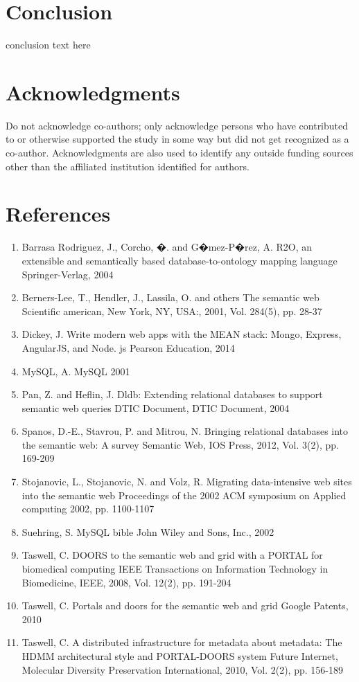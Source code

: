 \documentclass[10pt,twocolumn,twoside]{article}
\begin{document}
\section*{Conclusion}
\label{secConclusion}
conclusion text here


\section*{Acknowledgments}
Do not acknowledge co-authors; only acknowledge persons who have contributed
to or otherwise supported the study in some way but did not get recognized as a co-author.
Acknowledgments are also used to identify any outside funding sources other than
the affiliated institution identified for authors.


\section*{References}
\begin{enumerate}
\item Barrasa Rodriguez, J., Corcho, �. and G�mez-P�rez, A.
R2O, an extensible and semantically based database-to-ontology mapping language
Springer-Verlag, 2004
\item Berners-Lee, T., Hendler, J., Lassila, O. and others
The semantic web
Scientific american, New York, NY, USA:, 2001, Vol. 284(5), pp. 28-37
\item Dickey, J.
Write modern web apps with the MEAN stack: Mongo, Express, AngularJS, and Node. js
Pearson Education, 2014
\item MySQL, A.
MySQL
2001
\item Pan, Z. and Heflin, J.
Dldb: Extending relational databases to support semantic web queries
DTIC Document, DTIC Document, 2004
\item Spanos, D.-E., Stavrou, P. and Mitrou, N.
Bringing relational databases into the semantic web: A survey
Semantic Web, IOS Press, 2012, Vol. 3(2), pp. 169-209
\item Stojanovic, L., Stojanovic, N. and Volz, R.
Migrating data-intensive web sites into the semantic web
Proceedings of the 2002 ACM symposium on Applied computing
2002, pp. 1100-1107
\item Suehring, S.
MySQL bible
John Wiley and Sons, Inc., 2002
\item Taswell, C.
DOORS to the semantic web and grid with a PORTAL for biomedical computing
IEEE Transactions on Information Technology in Biomedicine, IEEE, 2008, Vol. 12(2), pp. 191-204
\item Taswell, C.
Portals and doors for the semantic web and grid
Google Patents, 2010
\item Taswell, C.
A distributed infrastructure for metadata about metadata: The HDMM architectural style and PORTAL-DOORS system
Future Internet, Molecular Diversity Preservation International, 2010, Vol. 2(2), pp. 156-189
\end{enumerate}


\nocite{*}


\end{document}
